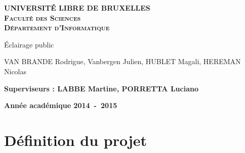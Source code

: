 \documentclass[a4paper,10pt]{report}
\begin{document}
\begin{titlepage}
\begin{center}
\textbf{\textsc{UNIVERSIT\'E LIBRE DE BRUXELLES}}\\
\textbf{\textsc{Faculté des Sciences}}\\
\textbf{\textsc{Département d'Informatique}}
\vfill{}\vfill{}
\begin{center}{\Huge \'Eclairage public}\end{center}{\Huge \par}
\begin{center}{\large VAN BRANDE Rodrigue, Vanbergen Julien, HUBLET Magali, HEREMAN Nicolas}\end{center}{\Huge \par}
\vfill{}\vfill{}
\begin{flushleft}{\large \textbf{Superviseurs : LABBE Martine, PORRETTA Luciano}}\hfill{}\end{flushleft}{\large\par}
\vfill{}\vfill{}\enlargethispage{3cm}
\textbf{Année académique 2014~-~2015}
\end{center}
\end{titlepage}



\tableofcontents


\chapter{D\'efinition du projet}



%
\end{document}

